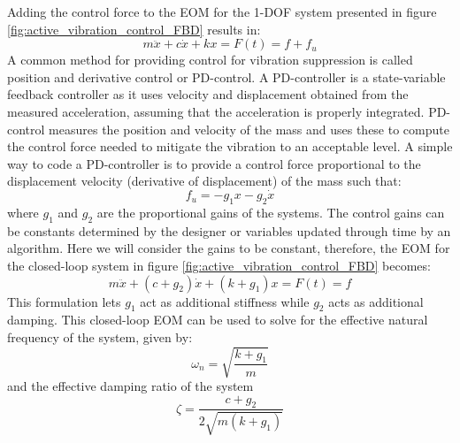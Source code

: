 \documentclass[12pt,letter]{article}
\begin{document}
Adding the control force to the EOM for the 1-DOF system presented in figure \ref{fig:active_vibration_control_FBD} results in:
\begin{equation}
m \ddot{x} + c \dot{x} + kx = F(t) = f + f_u
\end{equation}
A common method for providing control for vibration suppression is called position and derivative control or PD-control. A PD-controller is a state-variable feedback controller as it uses velocity and displacement obtained from the measured acceleration, assuming that the acceleration is properly integrated. PD-control measures the position and velocity of the mass and uses these to compute the control force needed to mitigate the vibration to an acceptable level. A simple way to code a PD-controller is to provide a control force proportional to the displacement velocity (derivative of displacement) of the mass such that:
\begin{equation}
f_u = -g_1x - g_2 \dot{x}
\end{equation}
where $g_1$ and $g_2$ are the proportional gains of the systems. The control gains can be constants determined by the designer or variables updated through time by an algorithm. Here we will consider the gains to be constant, therefore, the EOM for the closed-loop system in figure \ref{fig:active_vibration_control_FBD} becomes:
\begin{equation}
m \ddot{x} + (c + g_2) \dot{x} + (k + g_1)x = F(t) = f 
\end{equation}
This formulation lets $g_1$ act as additional stiffness while $g_2$ acts as additional damping. This closed-loop EOM can be used to solve for the effective natural frequency of the system, given by:
\begin{equation}
\omega_n = \sqrt{\frac{k+g_1}{m}}
\end{equation}
and the effective damping ratio of the system
\begin{equation}
\zeta = \frac{c+g_2}{2\sqrt{m(k+g_1)}}
\end{equation}
\end{document}
